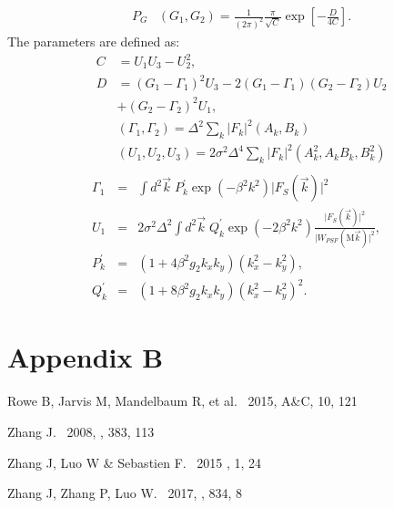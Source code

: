 \documentclass[twocolumn]{aastex62}
\begin{document}
\begin{eqnarray}
&P_G&\left(G_1,G_2\right)
=\frac{1}{(2\pi)^2}\frac{\pi}{\sqrt{C}}\exp\left[-\frac{D}{4C}\right].
\end{eqnarray}
The parameters are defined as:
\begin{eqnarray}
&C&=U_1U_3-U_2^2, \\ \nonumber
&D&=\left(G_1-\Gamma_1\right)^2U_3-2\left(G_1-\Gamma_1\right)\left(G_2-\Gamma_2\right)U_2 \\ \nonumber
&&+\left(G_2-\Gamma_2\right)^2U_1, \\ \nonumber
&&\left(\Gamma_1,\Gamma_2\right)=\Delta^2\sum_k\vert F_k\vert^2\left(A_k,B_k\right)\\ \nonumber
&&\left(U_1,U_2,U_3\right)=2\sigma^2\Delta^4\sum_k\vert F_k\vert^2\left(A_k^2,A_kB_k,B_k^2\right)\\ \nonumber
\end{eqnarray}
\begin{eqnarray}
\Gamma_1&=&\int{d}^2\vec{k}\;P_k^{\prime}\exp(-\beta^2k^2)\vert F_S(\vec{k})\vert^2 \\ \nonumber
U_1&=&2\sigma^2\Delta^2\int{d}^2\vec{k} \; Q_k^{\prime}\exp(-2\beta^2k^2)\frac{\vert F_S(\vec{k})\vert^2}{\vert W_{PSF}(\mathrm{M}\vec{k})\vert^2}, \\ \nonumber
P_k^{\prime}&=&\left(1+4\beta^2g_2k_xk_y\right)\left(k_x^2-k_y^2\right), \\ \nonumber
Q_k^{\prime}&=&\left(1+8\beta^2g_2k_xk_y\right)\left(k_x^2-k_y^2\right)^2.
\end{eqnarray}


\section{Appendix B}\label{app_b}
\begin{thebibliography}{}

Rowe B, Jarvis M, Mandelbaum R, et al. \ 2015, A\&C, 10, 121

 Zhang J. \ 2008, \mnras, 383, 113


 Zhang J, Luo W \& Sebastien F. \ 2015 \jcap, 1, 24

 Zhang J, Zhang P, Luo W. \ 2017, \apj, 834, 8

\end{thebibliography}
\end{document}
